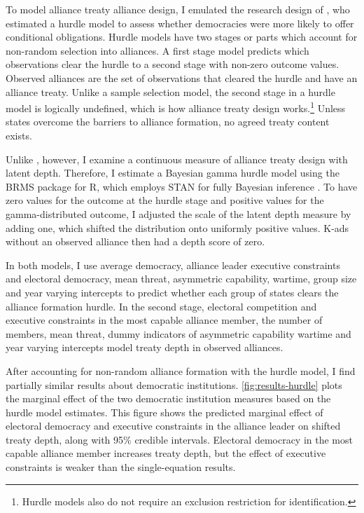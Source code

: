\documentclass[12pt]{article}
\begin{document}
To model alliance treaty alliance design, I emulated the research design of \citet{Chibaetal2015}, who estimated a hurdle model to assess whether democracies were more likely to offer conditional obligations.
Hurdle models have two stages or parts which account for non-random selection into alliances.
A first stage model predicts which observations clear the hurdle to a second stage with non-zero outcome values. 
Observed alliances are the set of observations that cleared the hurdle and have an alliance treaty. 
Unlike a sample selection model, the second stage in a hurdle model is logically undefined, which is how alliance treaty design works.\footnote{Hurdle models also do not require an exclusion restriction for identification.} 
Unless states overcome the barriers to alliance formation, no agreed treaty content exists. 


Unlike \citet{Chibaetal2015}, however, I examine a continuous measure of alliance treaty design with latent depth. 
Therefore, I estimate a Bayesian gamma hurdle model using the BRMS package for \textsf{R}, which employs STAN for fully Bayesian inference \citep{Buerkner2017}.
To have zero values for the outcome at the hurdle stage and positive values for the gamma-distributed outcome, I adjusted the scale of the latent depth measure by adding one, which shifted the distribution onto uniformly positive values. 
K-ads without an observed alliance then had a depth score of zero. 


In both models, I use average democracy, alliance leader executive constraints and electoral democracy, mean threat, asymmetric capability, wartime, group size and year varying intercepts to predict whether each group of states clears the alliance formation hurdle.
In the second stage, electoral competition and executive constraints in the most capable alliance member, the number of members, mean threat, dummy indicators of asymmetric capability wartime and year varying intercepts model treaty depth in observed alliances. 


After accounting for non-random alliance formation with the hurdle model, I find partially similar results about democratic institutions. 
\autoref{fig:results-hurdle} plots the marginal effect of the two democratic institution measures based on the hurdle model estimates. 
This figure shows the predicted marginal effect of electoral democracy and executive constraints in the alliance leader on shifted treaty depth, along with 95\% credible intervals.
Electoral democracy in the most capable alliance member increases treaty depth, but the effect of executive constraints is weaker than the single-equation results.  
\end{document}
